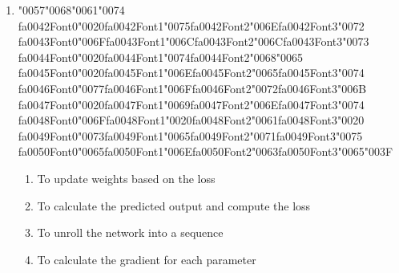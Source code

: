 \documentclass[12pt]{article}
\begin{document}
\begin{enumerate}[label=Q\arabic*.]
\begin{enumerate}[label=(\Alph*)]
    \item They do not use activation functions
\end{enumerate}
\item {\char"0057}{\char"0068}{\char"0061}{\char"0074} {\csname fa0042Font0\endcsname\char"0020}{\csname fa0042Font1\endcsname\char"0075}{\csname fa0042Font2\endcsname\char"006E}{\csname fa0042Font3\endcsname\char"0072} {\csname fa0043Font0\endcsname\char"006F}{\csname fa0043Font1\endcsname\char"006C}{\csname fa0043Font2\endcsname\char"006C}{\csname fa0043Font3\endcsname\char"0073} {\csname fa0044Font0\endcsname\char"0020}{\csname fa0044Font1\endcsname\char"0074}{\csname fa0044Font2\endcsname\char"0068}{\char"0065} {\csname fa0045Font0\endcsname\char"0020}{\csname fa0045Font1\endcsname\char"006E}{\csname fa0045Font2\endcsname\char"0065}{\csname fa0045Font3\endcsname\char"0074} {\csname fa0046Font0\endcsname\char"0077}{\csname fa0046Font1\endcsname\char"006F}{\csname fa0046Font2\endcsname\char"0072}{\csname fa0046Font3\endcsname\char"006B} {\csname fa0047Font0\endcsname\char"0020}{\csname fa0047Font1\endcsname\char"0069}{\csname fa0047Font2\endcsname\char"006E}{\csname fa0047Font3\endcsname\char"0074} {\csname fa0048Font0\endcsname\char"006F}{\csname fa0048Font1\endcsname\char"0020}{\csname fa0048Font2\endcsname\char"0061}{\csname fa0048Font3\endcsname\char"0020} {\csname fa0049Font0\endcsname\char"0073}{\csname fa0049Font1\endcsname\char"0065}{\csname fa0049Font2\endcsname\char"0071}{\csname fa0049Font3\endcsname\char"0075} {\csname fa0050Font0\endcsname\char"0065}{\csname fa0050Font1\endcsname\char"006E}{\csname fa0050Font2\endcsname\char"0063}{\csname fa0050Font3\endcsname\char"0065}{\char"003F}
\begin{enumerate}[label=(\Alph*)]
    \item To update weights based on the loss
    \item To calculate the predicted output and compute the loss
    \item To unroll the network into a sequence
    \item To calculate the gradient for each parameter
\end{enumerate}

\end{enumerate}
\end{document}
